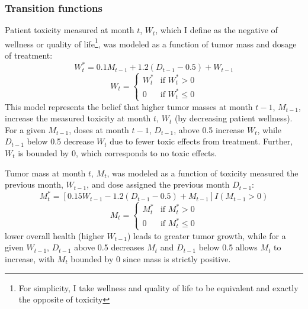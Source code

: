 \documentclass[12pt]{article}
\begin{document}
%

\subsubsection{Transition functions} %
\label{ssub:transition_functions}

Patient toxicity measured at month $t$, $W_{t}$, which I define as the negative of wellness or quality of life\footnote{For simplicity, I take wellness and quality of life to be equivalent and exactly the opposite of toxicity}, was modeled as a function of tumor mass and dosage of treatment:
%
\begin{equation}
W^{*}_{t} = 0.1 M_{t-1} + 1.2 (D_{t-1} - 0.5) + W_{t - 1}
\end{equation}
\begin{equation}
W_{t} = \begin{cases}
  W^{*}_{t} &\text{if } W^{*}_{t} > 0 \\
  0 &\text{if } W^{*}_{t} \leq 0
\end{cases}
\end{equation}
This model represents the belief that higher tumor masses at month $t-1$, $M_{t-1}$, increase the measured toxicity at month $t$, $W_{t}$ (by decreasing patient wellness). For a given $M_{t-1}$, doses at month $t-1$, $D_{t -1}$, above 0.5 increase $W_{t}$, while $D_{t -1}$ below 0.5 decrease $W_{t}$ due to fewer toxic effects from treatment. Further, $W_{t}$ is bounded by 0, which corresponds to no toxic effects.

Tumor mass at month $t$, $M_{t}$, was modeled as a function of toxicity measured the previous month, $W_{t-1}$, and dose assigned the previous month $D_{t-1}$:
%
\begin{equation}
M^{*}_{t} = [0.15 W_{t-1} - 1.2 (D_{t-1} - 0.5) + M_{t - 1}] I(M_{t-1} > 0)
\end{equation}
\begin{equation}
M_{t} = \begin{cases}
  M^{*}_{t} &\text{if } M^{*}_{t} > 0 \\
  0 &\text{if } M^{*}_{t} \leq 0
\end{cases}
\end{equation}
%
lower overall health (higher $W_{t-1}$) leads to greater tumor growth, while for a given $W_{t-1}$, $D_{t-1}$ above 0.5 decreases $M_{t}$ and $D_{t-1}$ below 0.5 allows $M_{t}$ to increase, with $M_{t}$ bounded by 0 since mass is strictly positive.
\end{document}
